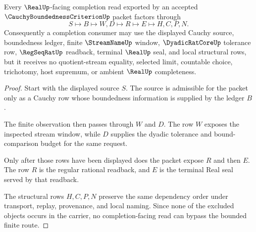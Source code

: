 \begin{theorem}
\label{thm:cauchy-boundedness-criterion-real-completion-handoff}
Every $\RealUp$-facing completion read exported by an accepted $\CauchyBoundednessCriterionUp$ packet factors through
$$
S \longmapsto B \longmapsto W,D \longmapsto R \longmapsto E \longmapsto H,C,P,N .
$$
Consequently a completion consumer may use the displayed Cauchy source, boundedness ledger, finite $\StreamNameUp$ window, $\DyadicRatCoreUp$ tolerance row, $\RegSeqRatUp$ readback, terminal $\RealUp$ seal, and local structural rows, but it receives no quotient-stream equality, selected limit, countable choice, trichotomy, host supremum, or ambient $\RealUp$ completeness.
\end{theorem}
\begin{proof}
Start with the displayed source $S$. The source is admissible for the packet only as a Cauchy row whose boundedness information is supplied by the ledger $B$.

The finite observation then passes through $W$ and $D$. The row $W$ exposes the inspected stream window, while $D$ supplies the dyadic tolerance and bound-comparison budget for the same request.

Only after those rows have been displayed does the packet expose $R$ and then $E$. The row $R$ is the regular rational readback, and $E$ is the terminal Real seal served by that readback.

The structural rows $H,C,P,N$ preserve the same dependency order under transport, replay, provenance, and local naming. Since none of the excluded objects occurs in the carrier, no completion-facing read can bypass the bounded finite route.
\end{proof}


\begin{closurestatus}{\CauchyBoundednessCriterionUp}
  \theoryclosure{\seedClosure}
  \formalstatus{\unformalizedV}
\end{closurestatus}
